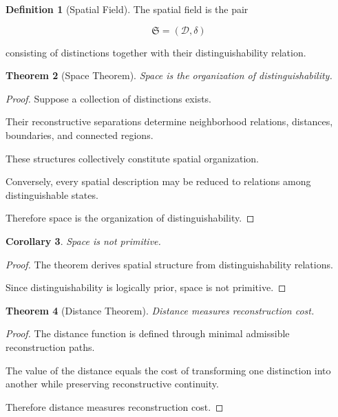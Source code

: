 \documentclass[12pt,oneside]{article}
\newtheorem{theorem}{Theorem}[section] \newtheorem{lemma}[theorem]{Lemma} \newtheorem{proposition}[theorem]{Proposition} \newtheorem{corollary}[theorem]{Corollary}
\theoremstyle{definition}
\newtheorem{definition}[theorem]{Definition} \newtheorem{axiom}[theorem]{Axiom} \newtheorem{remark}[theorem]{Remark} \newtheorem{example}[theorem]{Example}
\begin{document}
\begin{definition}[Spatial Field]

The spatial field is the pair

\[
\mathfrak S
=
(\mathcal D,\delta)
\]

consisting of distinctions together with their distinguishability relation.

\end{definition}

\begin{theorem}[Space Theorem]

Space is the organization of distinguishability.

\end{theorem}

\begin{proof}

Suppose a collection of distinctions exists.

Their reconstructive separations determine neighborhood relations, distances, boundaries, and connected regions.

These structures collectively constitute spatial organization.

Conversely, every spatial description may be reduced to relations among distinguishable states.

Therefore space is the organization of distinguishability.

\end{proof}

\begin{corollary}

Space is not primitive.

\end{corollary}

\begin{proof}

The theorem derives spatial structure from distinguishability relations.

Since distinguishability is logically prior, space is not primitive.

\end{proof}

\begin{theorem}[Distance Theorem]

Distance measures reconstruction cost.

\end{theorem}

\begin{proof}

The distance function is defined through minimal admissible reconstruction paths.

The value of the distance equals the cost of transforming one distinction into another while preserving reconstructive continuity.

Therefore distance measures reconstruction cost.

\end{proof}
\end{document}
